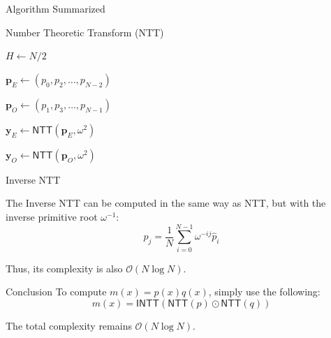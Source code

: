 \documentclass{zkdl-presentation-template}
\begin{document}
    \begin{frame}{Algorithm Summarized}
        \begin{algorithm}[H]
            \caption{Number Theoretic Transform (NTT)}
        
        
            $H \gets N/2$ 
        
            $\boldsymbol{p}_{E} \gets (p_0,p_2,\dots,p_{N-2})$ 
        
            $\boldsymbol{p}_{O} \gets (p_1,p_3,\dots,p_{N-1})$ 
        
            $\boldsymbol{y}_E \gets \mathsf{NTT}(\boldsymbol{p}_{E}, \omega^2)$ 
        
            $\boldsymbol{y}_O \gets \mathsf{NTT}(\boldsymbol{p}_O, \omega^2)$ 
        
        \end{algorithm}
    \end{frame}

    \begin{frame}{Inverse NTT}
        \begin{theorem}
            The Inverse NTT can be computed in the same way as NTT, but with the 
            inverse primitive root $\omega^{-1}$:
            \begin{equation*}
                p_j = \frac{1}{N}\sum_{i=0}^{N-1}\omega^{-ij}\hat{p}_i
            \end{equation*}

            Thus, its complexity is also $\mathcal{O}(N \log N)$.\pause
        \end{theorem}

        \begin{block}{Conclusion}
            To compute $m(x) = p(x)q(x)$, simply use the following:
            \begin{equation*}
                m(x) = \mathsf{INTT}(\mathsf{NTT}(p) \odot \mathsf{NTT}(q))
            \end{equation*}

            The total complexity remains $\mathcal{O}(N \log N)$.
        \end{block}
    \end{frame}
\end{document}
